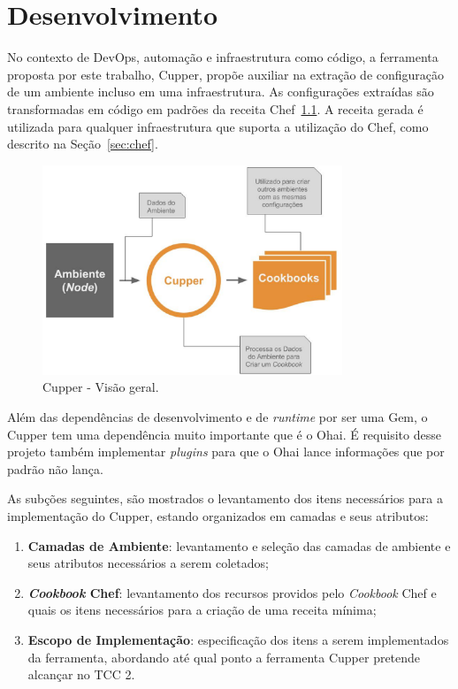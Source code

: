 \newpage\null\thispagestyle{empty}\newpage
\chapter{Desenvolvimento}
\label{chap:desenv}

No contexto de DevOps, automação e infraestrutura como código, a ferramenta
proposta por este trabalho, Cupper, propõe auxiliar na extração de configuração
de um ambiente incluso em uma infraestrutura. As configurações extraídas são
transformadas em código em padrões da receita Chef~\ref{fig:cupper_geral}. A
receita gerada é utilizada para qualquer infraestrutura que suporta a
utilização do Chef, como descrito na Seção~\ref{sec:chef}.

\begin{figure}[H]
  \centering
  \caption{Cupper - Visão geral.}
  \label{fig:cupper_geral}
  \includegraphics[width=0.8\textwidth]{figuras/cupper_geral.eps}
\end{figure}

Além das dependências de desenvolvimento e de \textit{runtime} por ser uma Gem,
o Cupper tem uma dependência muito
importante que é o Ohai. É requisito desse projeto também implementar
\textit{plugins} para que o Ohai lance informações que por padrão 
não lança.

As subções seguintes, são mostrados o levantamento dos itens necessários para
a implementação do Cupper, estando organizados em camadas e seus atributos:

\begin{enumerate}
  \item \textbf{Camadas de Ambiente}: levantamento e seleção das camadas de ambiente
    e seus atributos necessários a serem coletados;
  \item \textbf{\textit{Cookbook} Chef}: levantamento dos recursos providos pelo \textit{Cookbook} Chef e quais os
    itens necessários para a criação de uma receita mínima;
  \item \textbf{Escopo de Implementação}: especificação dos itens a serem implementados
    da ferramenta, abordando até qual ponto a ferramenta Cupper pretende alcançar
    no TCC 2.
\end{enumerate}




